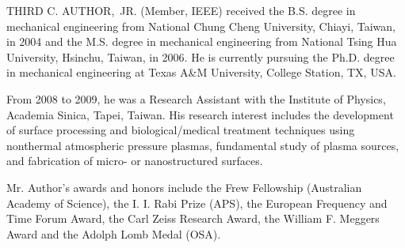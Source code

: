 \documentclass{IEEEoj}
\begin{document}
\begin{IEEEbiography}{THIRD
C. AUTHOR,~JR. } (Member, IEEE) received the B.S. degree in mechanical 
engineering from National Chung Cheng University, Chiayi, Taiwan, in 2004 
and the M.S. degree in mechanical engineering from National Tsing Hua 
University, Hsinchu, Taiwan, in 2006. He is currently pursuing the Ph.D. 
degree in mechanical engineering at Texas A{\&}M University, College 
Station, TX, USA.

From 2008 to 2009, he was a Research Assistant with the Institute of 
Physics, Academia Sinica, Tapei, Taiwan. His research interest includes the 
development of surface processing and biological/medical treatment 
techniques using nonthermal atmospheric pressure plasmas, fundamental study 
of plasma sources, and fabrication of micro- or nanostructured surfaces. 

Mr. Author's awards and honors include the Frew Fellowship (Australian 
Academy of Science), the I. I. Rabi Prize (APS), the European Frequency and 
Time Forum Award, the Carl Zeiss Research Award, the William F. Meggers 
Award and the Adolph Lomb Medal (OSA).
\end{IEEEbiography}
\end{document}
